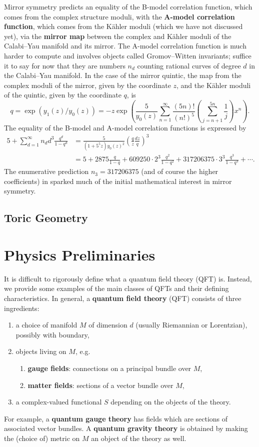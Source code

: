 \documentclass{report}
\theoremstyle{plain}
\theoremstyle{definition}
\theoremstyle{remark}
\begin{document}
Mirror symmetry predicts an equality of the B-model correlation
function, which comes from the complex structure moduli, with the {\bf
  A-model correlation function}, which comes from the K\"ahler moduli
(which we have not discussed yet), via the {\bf mirror map} between
the complex and K\"ahler moduli of the Calabi--Yau manifold and its
mirror. The A-model correlation function is much harder to compute and
involves objects called Gromov--Witten invariants; suffice it to say
for now that they are numbers $n_d$ counting rational curves of degree
$d$ in the Calabi--Yau manifold. In the case of the mirror quintic,
the map from the complex moduli of the mirror, given by the coordinate
$z$, and the K\"ahler moduli of the quintic, given by the coordinate
$q$, is
\[ q = \exp(y_1(z)/y_0(z)) = -z \exp\left(\frac{5}{y_0(z)} \sum_{n=1}^\infty \frac{(5n)!}{(n!)^5} \left(\sum_{j=n+1}^{5n} \frac{1}{j}\right) x^n\right). \]
The equality of the B-model and A-model correlation functions is
expressed by
\begin{align*}
  5 + \sum_{d=1}^\infty n_d d^3 \frac{q^d}{1 - q^d}
  &= \frac{5}{(1 + 5^5z) y_0(z)^2} \left(\frac{q}{z} \frac{dz}{q}\right)^3 \\
  &= 5 + 2875 \frac{q}{1-q} + 609250 \cdot 2^3 \frac{q^2}{1 - q^2} + 317206375 \cdot 3^3 \frac{q^3}{1 - q^3} + \cdots.
\end{align*}
The enumerative prediction $n_3 = 317206375$ (and of course the higher
coefficients) in \cite{Candelas1991a} sparked much of the initial
mathematical interest in mirror symmetry.

\section{Toric Geometry}

\chapter{Physics Preliminaries}

It is difficult to rigorously define what a quantum field theory (QFT)
is. Instead, we provide some examples of the main classes of QFTs and
their defining characteristics. In general, a {\bf quantum field
  theory} (QFT) consists of three ingredients:
\begin{enumerate}
\item a choice of manifold $M$ of dimension $d$ (usually Riemannian or
  Lorentzian), possibly with boundary,
\item objects living on $M$, e.g.
  \begin{enumerate}
  \item {\bf gauge fields}: connections on a principal bundle over
    $M$,
  \item {\bf matter fields}: sections of a vector bundle over $M$,
  \end{enumerate}
\item a complex-valued functional $S$ depending on the objects of the
  theory.
\end{enumerate}
For example, a \textbf{quantum gauge theory} has fields which are
sections of associated vector bundles. A \textbf{quantum gravity
  theory} is obtained by making the (choice of) metric on $M$ an
object of the theory as well.
\end{document}
